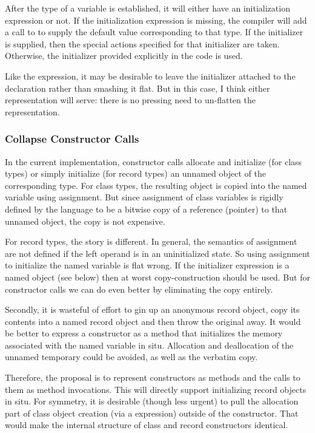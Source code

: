 After the type of a variable is established, it will either have an initialization
expression or not.  If the initialization expression is missing, the compiler will add a
call to  to supply the default value corresponding to that type.  If the
 initializer is supplied, then the special actions specified for
that initializer are taken.  Otherwise, the initializer provided explicitly in the code is
used.

Like the  expression, it may be desirable to leave the initializer attached
to the declaration rather than smashing it flat.  But in this case, I think either
representation will serve: there is no pressing need to un-flatten the representation.

\subsubsection{Collapse Constructor Calls}

In the current implementation, constructor calls allocate and initialize (for class types)
or simply initialize (for record types) an unnamed object of the corresponding type.  
For class types, the resulting object is copied into the named variable using assignment.
But since assignment of class variables is rigidly defined by the language to be a bitwise
copy of a reference (pointer) to that unnamed object, the copy is not expensive.

For record types, the story is different.  In general, the semantics of assignment are not
defined if the left operand is in an uninitialized state.  So using assignment to
initialize the named variable is flat wrong.  If the initializer expression is a named
object (see below) then at worst copy-construction should be used.  But for constructor
calls we can do even better by eliminating the copy entirely.

Secondly, it is wasteful of effort to gin up
an anonymous record object, copy its contents into a named record object and then throw
the original away.  It would be better to express a constructor as a method that
initializes the memory associated with the named variable in situ.  Allocation and
deallocation of the unnamed temporary could be avoided, as well as the verbatim copy.

Therefore, the proposal is to represent constructors as methods and the calls to them as
method invocations.  This will directly support initializing record objects in situ.  For
symmetry, it is desirable (though less urgent) to pull the allocation part of class
object creation (via a  expression) outside of the constructor.  That would make
the internal structure of class and record constructors identical.  

